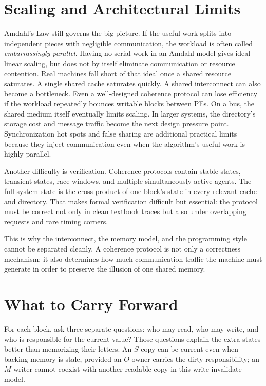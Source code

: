 \section{Scaling and Architectural Limits}\label{sec:mp-scaling}
Amdahl's Law still governs the big picture.
If the useful work splits into independent pieces with negligible communication, the workload is often called \textit{embarrassingly parallel}.
Having no serial work in an Amdahl model gives ideal linear scaling, but does not by itself eliminate communication or resource contention.
Real machines fall short of that ideal once a shared resource saturates.
A single shared cache saturates quickly.
A shared interconnect can also become a bottleneck.
Even a well-designed coherence protocol can lose efficiency if the workload repeatedly bounces writable blocks between PEs.
On a bus, the shared medium itself eventually limits scaling.
In larger systems, the directory's storage cost and message traffic become the next design pressure point.
Synchronization hot spots and false sharing are additional practical limits because they inject communication even when the algorithm's useful work is highly parallel.

Another difficulty is verification.
Coherence protocols contain stable states, transient states, race windows, and multiple simultaneously active agents.
The full system state is the cross-product of one block's state in every relevant cache and directory.
That makes formal verification difficult but essential: the protocol must be correct not only in clean textbook traces but also under overlapping requests and rare timing corners.

This is why the interconnect, the memory model, and the programming style cannot be separated cleanly.
A coherence protocol is not only a correctness mechanism; it also determines how much communication traffic the machine must generate in order to preserve the illusion of one shared memory.


\section{What to Carry Forward}\label{sec:chapter8-summary}
For each block, ask three separate questions: who may read, who may write, and who is responsible for the current value?
Those questions explain the extra states better than memorizing their letters.
An $S$ copy can be current even when backing memory is stale, provided an $O$ owner carries the dirty responsibility; an $M$ writer cannot coexist with another readable copy in this write-invalidate model.

